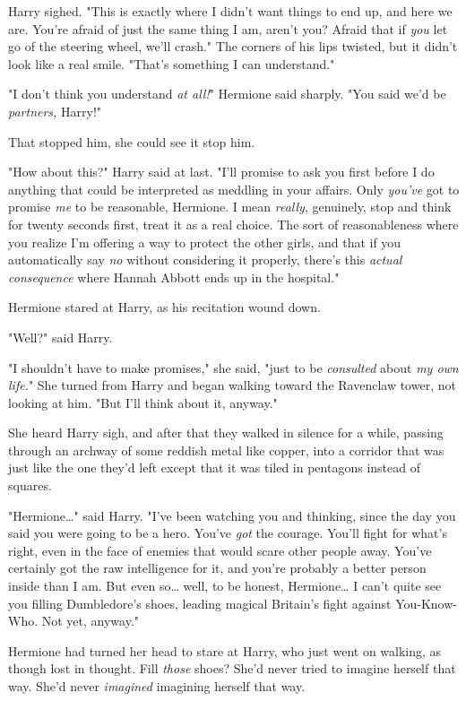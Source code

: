 Harry sighed. "This is exactly where I didn't want things to end up, and here 
we are. You're afraid of just the same thing I am, aren't you? Afraid that if 
\emph{you} let go of the steering wheel, we'll crash." The corners of his lips 
twisted, but it didn't look like a real smile. "That's something I can 
understand."

"I don't think you understand \emph{at all!}" Hermione said sharply. "You said 
we'd be \emph{partners,} Harry!"

That stopped him, she could see it stop him.

"How about this?" Harry said at last. "I'll promise to ask you first before I 
do anything that could be interpreted as meddling in your affairs. Only 
\emph{you've} got to promise \emph{me} to be reasonable, Hermione. I mean 
\emph{really}, genuinely, stop and think for twenty seconds first, treat it as 
a real choice. The sort of reasonableness where you realize I'm offering a way 
to protect the other girls, and that if you automatically say \emph{no} without 
considering it properly, there's this \emph{actual consequence} where Hannah 
Abbott ends up in the hospital."

Hermione stared at Harry, as his recitation wound down.

"Well?" said Harry.

"I shouldn't have to make promises," she said, "just to be \emph{consulted} 
about \emph{my own life.}" She turned from Harry and began walking toward the 
Ravenclaw tower, not looking at him. "But I'll think about it, anyway."

She heard Harry sigh, and after that they walked in silence for a while, 
passing through an archway of some reddish metal like copper, into a corridor 
that was just like the one they'd left except that it was tiled in pentagons 
instead of squares.

"Hermione{\ldots}" said Harry. "I've been watching you and thinking, since the 
day you said you were going to be a hero. You've \emph{got} the courage. You'll 
fight for what's right, even in the face of enemies that would scare other 
people away. You've certainly got the raw intelligence for it, and you're 
probably a better person inside than I am. But even so{\ldots} well, to be 
honest, Hermione{\ldots} I can't quite see you filling Dumbledore's shoes, 
leading magical Britain's fight against You-Know-Who. Not yet, anyway."

Hermione had turned her head to stare at Harry, who just went on walking, as 
though lost in thought. Fill \emph{those} shoes? She'd never tried to imagine 
herself that way. She'd never \emph{imagined} imagining herself that way.

